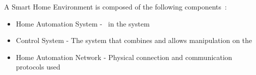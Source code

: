 



A Smart Home Environment is composed of the following components~\citep{overview-smart-home-environment}: 
\begin{itemize}
\item Home Automation System - \Sdevs~in the system
\item Control System - The system that combines and allows manipulation on the \sdevs
\item Home Automation Network - Physical connection and communication protocols used
\end{itemize}